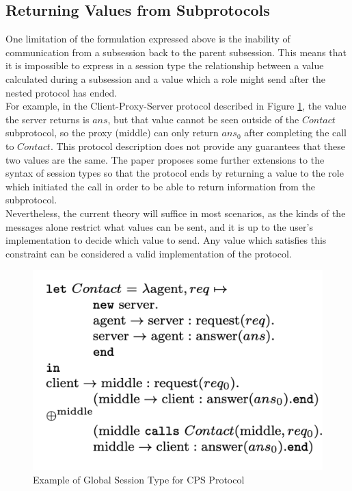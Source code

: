 \documentclass[12pt,twoside]{report}
\newcommand{\comment}[1]{}
\begin{document}
\subsection{Returning Values from Subprotocols}\label{nested-protocols-return-value}
One limitation of the formulation expressed above is the inability of communication from a subsession back to the parent subsession. This means that it is impossible to express in a session type the relationship between a value calculated during a subsession and a value which a role might send after the nested protocol has ended. \\

For example, in the Client-Proxy-Server protocol described in Figure \ref{nested_session_example}, the value the server returns is $ans$, but that value cannot be seen outside of the $Contact$ subprotocol, so the proxy (middle) can only return $ans_0$ after completing the call to $Contact$. This protocol description does not provide any guarantees that these two values are the same. The paper proposes some further extensions to the syntax of session types so that the protocol ends by returning a value to the role which initiated the call in order to be able to return information from the subprotocol. \\

Nevertheless, the current theory will suffice in most scenarios, as the kinds of the messages alone restrict what values can be sent, and it is up to the user's implementation to decide which value to send. Any value which satisfies this constraint can be considered a valid implementation of the protocol.
\begin{figure}[h]
    \centering
    \includegraphics[scale=0.5]{nested_session_example.png}
    \caption{Example of Global Session Type for CPS Protocol\cite{nestedprotocols}\comment{nested protocols snippet}}
    \label{nested_session_example}
\end{figure}{}
\end{document}
